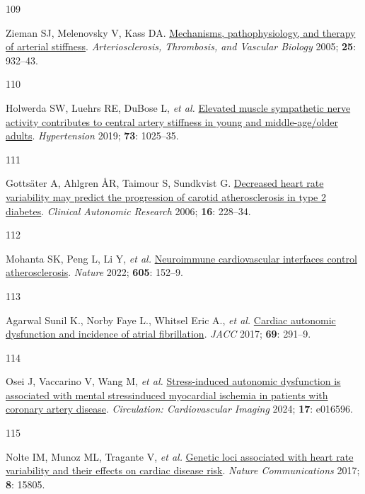 \documentclass[
  letterpaper,
  headsepline=true,
  open=any]{scrbook}
\newlength{\cslhangindent}
\newlength{\csllabelwidth}
\newlength{\cslentryspacingunit} %
\newenvironment{CSLReferences}[2] %
 {%
  \setlength{\parindent}{0pt}
  \ifodd #1
  \let\oldpar\par
  \def\par{\hangindent=\cslhangindent\oldpar}
  \fi
  \setlength{\parskip}{#2\cslentryspacingunit}
 }%
 {}
\newcommand{\CSLLeftMargin}[1]{\parbox[t]{\csllabelwidth}{#1}}
\newcommand{\CSLRightInline}[1]{\parbox[t]{\linewidth - \csllabelwidth}{#1}\break}
\begin{document}
\begin{CSLReferences}{0}{0}
\leavevmode{}%
\CSLLeftMargin{109 }%
\CSLRightInline{Zieman SJ, Melenovsky V, Kass DA.
\href{https://doi.org/10.1161/01.ATV.0000160548.78317.29}{Mechanisms,
pathophysiology, and therapy of arterial stiffness}.
\emph{Arteriosclerosis, Thrombosis, and Vascular Biology} 2005;
\textbf{25}: 932--43.}

\leavevmode{}%
\CSLLeftMargin{110 }%
\CSLRightInline{Holwerda SW, Luehrs RE, DuBose L, \emph{et al.}
\href{https://doi.org/doi:10.1161/HYPERTENSIONAHA.118.12462}{Elevated
muscle sympathetic nerve activity contributes to central artery
stiffness in young and middle-age/older adults}. \emph{Hypertension}
2019; \textbf{73}: 1025--35.}

\leavevmode{}%
\CSLLeftMargin{111 }%
\CSLRightInline{Gottsäter A, Ahlgren ÅR, Taimour S, Sundkvist G.
\href{https://doi.org/10.1007/s10286-006-0345-4}{Decreased heart rate
variability may predict the progression of carotid atherosclerosis in
type 2 diabetes}. \emph{Clinical Autonomic Research} 2006; \textbf{16}:
228--34.}

\leavevmode{}%
\CSLLeftMargin{112 }%
\CSLRightInline{Mohanta SK, Peng L, Li Y, \emph{et al.}
\href{https://doi.org/10.1038/s41586-022-04673-6}{Neuroimmune
cardiovascular interfaces control atherosclerosis}. \emph{Nature} 2022;
\textbf{605}: 152--9.}

\leavevmode{}%
\CSLLeftMargin{113 }%
\CSLRightInline{Agarwal Sunil K., Norby Faye L., Whitsel Eric A.,
\emph{et al.} \href{https://doi.org/10.1016/j.jacc.2016.10.059}{Cardiac
autonomic dysfunction and incidence of atrial fibrillation}. \emph{JACC}
2017; \textbf{69}: 291--9.}

\leavevmode{}%
\CSLLeftMargin{114 }%
\CSLRightInline{Osei J, Vaccarino V, Wang M, \emph{et al.}
\href{https://doi.org/10.1161/CIRCIMAGING.124.016596}{Stress-induced
autonomic dysfunction is associated with mental
stress{\textendash}induced myocardial ischemia in patients with coronary
artery disease}. \emph{Circulation: Cardiovascular Imaging} 2024;
\textbf{17}: e016596.}

\leavevmode{}%
\CSLLeftMargin{115 }%
\CSLRightInline{Nolte IM, Munoz ML, Tragante V, \emph{et al.}
\href{https://doi.org/10.1038/ncomms15805}{Genetic loci associated with
heart rate variability and their effects on cardiac disease risk}.
\emph{Nature Communications} 2017; \textbf{8}: 15805.}


\end{CSLReferences}
\end{document}

